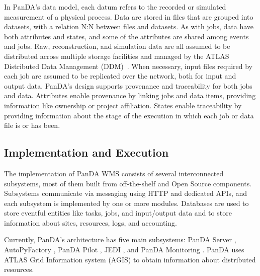In PanDA's data model, each datum refers to the recorded or simulated
measurement of a physical process. Data are stored in files that are grouped
into datasets, with a relation N:N between files and datasets. As with jobs,
data have both attributes and states, and some of the attributes are shared
among events and jobs. Raw, reconstruction, and simulation data are all
assumed to be distributed across multiple storage facilities and managed by
the ATLAS Distributed Data Management (DDM)~\cite{garonne2012atlas}. When
necessary, input files required by each job are assumed to be replicated over
the network, both for input and output data. PanDA's design supports
provenance and traceability for both jobs and data. Attributes enable
provenance by linking jobs and data items, providing information like
ownership or project affiliation. States enable traceability by providing
information about the stage of the execution in which each job or data file
is or has been.

\subsection{Implementation and Execution}
\label{subsec:implementation}

The implementation of PanDA WMS consists of several interconnected
subsystems, most of them built from off-the-shelf and Open Source components.
Subsystems communicate via messaging using HTTP and dedicated APIs, and each
subsystem is implemented by one or more modules. Databases are used to store
eventful entities like tasks, jobs, and input/output data and to store
information about sites, resources, logs, and accounting.

Currently, PanDA's architecture has five main subsystems:
PanDA Server \cite{maeno2011overview},
AutoPyFactory \cite{caballero2012autopyfactory]},
PanDA Pilot \cite{nilsson2011atlas},
JEDI \cite{borodin2015scaling},
and PanDA Monitoring \cite{klimentov2011atlas}. PanDA uses ATLAS Grid
Information system (AGIS) \cite{1742-6596-513-3-032001} to obtain information
about distributed resources.

